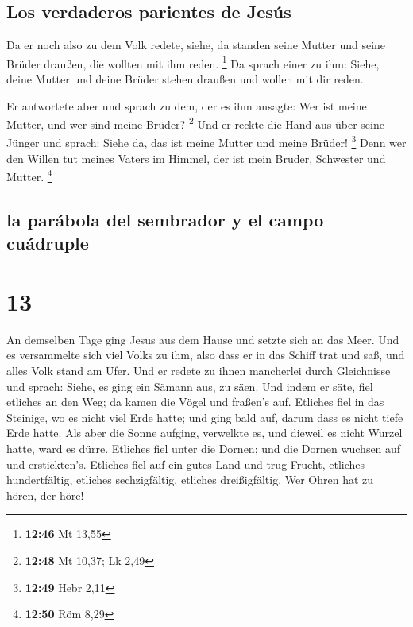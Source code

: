\hypertarget{los-verdaderos-parientes-de-jesuxfas}{%
\subsection{Los verdaderos parientes de
Jesús}\label{los-verdaderos-parientes-de-jesuxfas}}

 Da er noch also zu dem Volk redete, siehe, da standen
seine Mutter und seine Brüder draußen, die wollten mit ihm reden.
\footnote{\textbf{12:46} Mt 13,55}  Da sprach einer zu
ihm: Siehe, deine Mutter und deine Brüder stehen draußen und wollen mit
dir reden.

 Er antwortete aber und sprach zu dem, der es ihm
ansagte: Wer ist meine Mutter, und wer sind meine Brüder? \footnote{\textbf{12:48}
  Mt 10,37; Lk 2,49}  Und er reckte die Hand aus über
seine Jünger und sprach: Siehe da, das ist meine Mutter und meine
Brüder! \footnote{\textbf{12:49} Hebr 2,11}  Denn wer den
Willen tut meines Vaters im Himmel, der ist mein Bruder, Schwester und
Mutter. \footnote{\textbf{12:50} Röm 8,29}

\hypertarget{la-paruxe1bola-del-sembrador-y-el-campo-cuuxe1druple}{%
\subsection{la parábola del sembrador y el campo
cuádruple}\label{la-paruxe1bola-del-sembrador-y-el-campo-cuuxe1druple}}

\hypertarget{section-12}{%
\section{13}\label{section-12}}

 An demselben Tage ging Jesus aus dem Hause und setzte
sich an das Meer.  Und es versammelte sich viel Volks zu
ihm, also dass er in das Schiff trat und saß, und alles Volk stand am
Ufer.  Und er redete zu ihnen mancherlei durch Gleichnisse
und sprach: Siehe, es ging ein Sämann aus, zu säen.  Und
indem er säte, fiel etliches an den Weg; da kamen die Vögel und fraßen's
auf.  Etliches fiel in das Steinige, wo es nicht viel Erde
hatte; und ging bald auf, darum dass es nicht tiefe Erde hatte.
 Als aber die Sonne aufging, verwelkte es, und dieweil es
nicht Wurzel hatte, ward es dürre.  Etliches fiel unter
die Dornen; und die Dornen wuchsen auf und erstickten's. 
Etliches fiel auf ein gutes Land und trug Frucht, etliches
hundertfältig, etliches sechzigfältig, etliches dreißigfältig.
 Wer Ohren hat zu hören, der höre!


